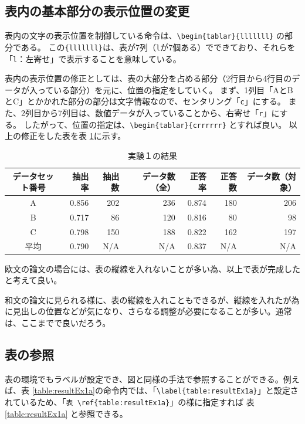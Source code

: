 \subsection{表内の基本部分の表示位置の変更}
表内の文字の表示位置を制御している命令は、\verb+\begin{tablar}{lllllll}+
の部分である。
この\verb+{lllllll}+は、表が7列（\verb+l+が7個ある）でできており、それらを「\verb+l+：左寄せ」で表示することを意味している。

表内の表示位置の修正としては、表の大部分を占める部分（2行目から4行目のデータが入っている部分）を元に、位置の指定をしていく。
まず、1列目「AとBとC」とかかれた部分の部分は文字情報なので、センタリング「\verb+c+」にする。
また、2列目から7列目は、数値データが入っていることから、右寄せ「\verb+r+」にする。
したがって、位置の指定は、\verb+\begin{tablar}{crrrrrr}+ とすれば良い。
以上の修正をした表を表 \ref{table:resultEx1c}に示す。
\begin{table}[H]
\caption{実験１の結果}
\centering
\begin{tabular}{crrrrrr}
\hline
データセット番号 & 抽出率 & 抽出数 & データ数（全） & 正答率 & 正答数 & データ数（対象）\\ \hline \hline
A & 0.856 & 202 & 236 & 0.874 & 180 & 206\\ \hline
B & 0.717 & 86 & 120 & 0.816 & 80 & 98\\ \hline
C & 0.798 & 150 & 188 & 0.822 & 162 & 197\\ \hline \hline
平均 & 0.790 & N/A & N/A & 0.837 & N/A & N/A\\ \hline
\end{tabular}
\label{table:resultEx1c}
\end{table}

欧文の論文の場合には、表の縦線を入れないことが多い為、以上で表が完成したと考えて良い。

和文の論文に見られる様に、表の縦線を入れこともできるが、縦線を入れたが為に見出しの位置などが気になり、さらなる調整が必要になることが多い。通常は、ここまでで良いだろう。

\subsection{表の参照}
表の環境でもラベルが設定でき、図と同様の手法で参照することができる。例えば、表 \ref{table:resultEx1a}の命令内では、「\verb+\label{table:resultEx1a}+」と設定されているため、「\verb+表 \ref{table:resultEx1a}+」の様に指定すれば 表 \ref{table:resultEx1a} と参照できる。

